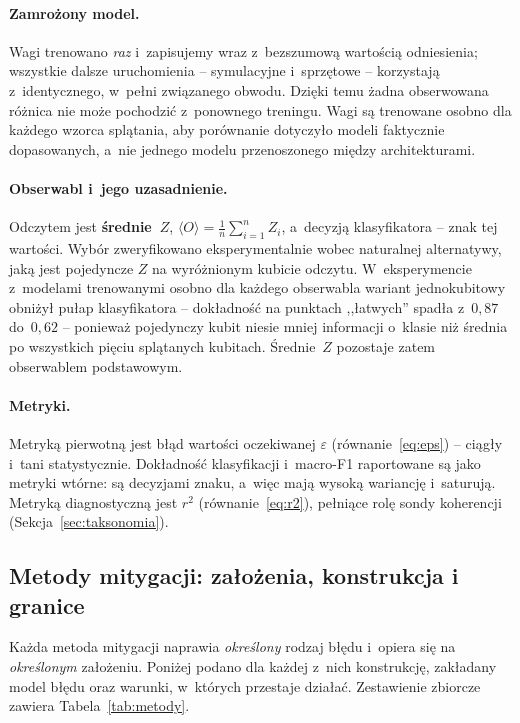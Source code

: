 \documentclass[11pt]{article}
\newcommand{\expv}{\langle O\rangle}
\begin{document}
\paragraph{Zamrożony model.} Wagi trenowano \emph{raz} i~zapisujemy wraz z~bezszumową wartością
odniesienia; wszystkie dalsze uruchomienia -- symulacyjne i~sprzętowe -- korzystają z~identycznego,
w~pełni związanego obwodu. Dzięki temu żadna obserwowana różnica nie może pochodzić z~ponownego
treningu. Wagi są trenowane osobno dla każdego wzorca splątania, aby porównanie dotyczyło modeli
faktycznie dopasowanych, a~nie jednego modelu przenoszonego między architekturami.

\paragraph{Obserwabl i~jego uzasadnienie.} Odczytem jest \textbf{średnie~$Z$},
$\expv=\tfrac{1}{n}\sum_{i=1}^{n} Z_i$, a~decyzją klasyfikatora -- znak tej wartości. Wybór
zweryfikowano eksperymentalnie wobec naturalnej alternatywy, jaką jest pojedyncze $Z$ na wyróżnionym
kubicie odczytu. W~eksperymencie z~modelami trenowanymi osobno dla każdego obserwabla wariant
jednokubitowy obniżył pułap klasyfikatora -- dokładność na punktach ,,łatwych'' spadła z~$0{,}87$
do~$0{,}62$ -- ponieważ pojedynczy kubit niesie mniej informacji o~klasie niż średnia po wszystkich
pięciu splątanych kubitach. Średnie~$Z$ pozostaje zatem obserwablem podstawowym.

\paragraph{Metryki.} Metryką pierwotną jest błąd wartości oczekiwanej $\varepsilon$
(równanie~\eqref{eq:eps}) -- ciągły i~tani statystycznie. Dokładność klasyfikacji i~macro-F1
raportowane są jako metryki wtórne: są decyzjami znaku, a~więc mają wysoką wariancję i~saturują.
Metryką diagnostyczną jest $r^2$ (równanie~\eqref{eq:r2}), pełniące rolę sondy koherencji
(Sekcja~\ref{sec:taksonomia}).

\subsection{Metody mitygacji: założenia, konstrukcja i granice}\label{sec:metody-mitygacji}

Każda metoda mitygacji naprawia \emph{określony} rodzaj błędu i~opiera się na \emph{określonym}
założeniu. Poniżej podano dla każdej z~nich konstrukcję, zakładany model błędu oraz warunki,
w~których przestaje działać. Zestawienie zbiorcze zawiera Tabela~\ref{tab:metody}.
\end{document}
